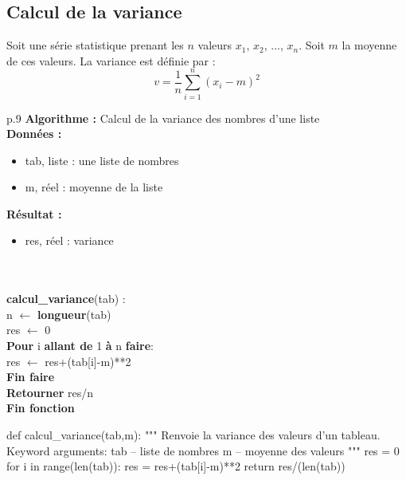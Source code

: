 \documentclass[10pt]{article}
\begin{document}
\subsection{Calcul de la variance}
Soit une série statistique prenant les $n$ valeurs $x_1$, $x_2$, ..., $x_n$. Soit $m$ la moyenne de ces valeurs. La variance est définie par :
$$
v = \dfrac{1}{n} \sum\limits_{i=1}^n\left(x_i - m \right)^2
$$


\begin{minipage}[c]{.48\linewidth}
\begin{pseudo}
\begin{center}
\begin{tabular}{p{.9\textwidth}}
\hline
\textbf{Algorithme :} Calcul de la variance des nombres d'une liste\\
\hline
\textbf{Données :}
\begin{itemize}
\item \textsf{tab}, liste : une liste de nombres
\item \textsf{m}, réel : moyenne de la liste
\end{itemize}
\textbf{Résultat :} 
\begin{itemize}
\item \textsf{res}, réel : variance
\end{itemize} \\
\\
\textbf{calcul\_variance}(\textsf{tab}) :\\
\hspace{.4cm}\textsf{n} $\leftarrow$ \textbf{longueur}(\textsf{tab}) \\
\hspace{.4cm}\textsf{res} $\leftarrow$ \textsf{0} \\
\hspace{.4cm}\textbf{Pour} \textsf{i} \textbf{allant de} \textsf{1} \textbf{à} \textsf{n} \textbf{faire}: \\
\hspace{.8cm} \textsf{res  $\leftarrow$ res+(tab[i]-m)**2} \\
\hspace{.4cm}\textbf{Fin faire} \\
\hspace{.4cm}\textbf{Retourner} \textsf{res/n}\\
\textbf{Fin fonction} \\
\hline
\end{tabular}
\end{center}

\end{pseudo}
\end{minipage} \hfill
\begin{minipage}[c]{.48\linewidth}
\begin{py}
\begin{python}
def calcul_variance(tab,m):
    """ 
    Renvoie la variance des valeurs d'un tableau.
    Keyword arguments:
    tab -- liste de nombres
    m -- moyenne des valeurs
    """
    res = 0
    for i in range(len(tab)):
        res = res+(tab[i]-m)**2
    return res/(len(tab))
\end{python}
\end{py}
\end{minipage} 
\end{document}
